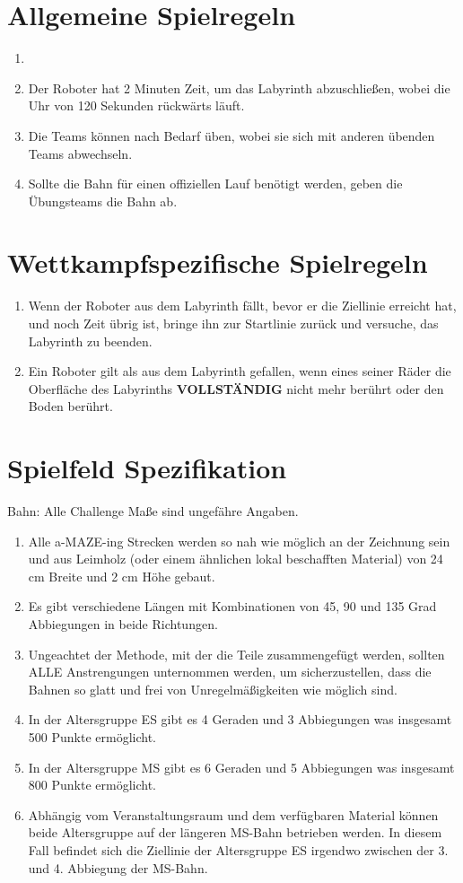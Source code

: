 \documentclass[a4paper,12pt]{article}
\begin{document}
\section{Allgemeine Spielregeln}
\begin{enumerate}
	\item \scoreRuns
	\item Der Roboter hat 2 Minuten Zeit, um das Labyrinth abzuschließen,
		wobei die Uhr von 120 Sekunden rückwärts läuft.
	\item Die Teams können nach Bedarf üben, wobei sie sich mit anderen
		übenden Teams abwechseln.
	\item Sollte die Bahn für einen offiziellen Lauf benötigt werden, geben
		die Übungsteams die Bahn ab.
\end{enumerate}

\section{Wettkampfspezifische Spielregeln}
\begin{enumerate}
	\item Wenn der Roboter aus dem Labyrinth fällt, bevor er die Ziellinie
		erreicht hat, und noch Zeit übrig ist, bringe ihn zur
		Startlinie zurück und versuche, das Labyrinth zu beenden.
	\item Ein Roboter gilt als aus dem Labyrinth gefallen, wenn eines
		seiner Räder die Oberfläche des Labyrinths \textbf{VOLLSTÄNDIG}
		nicht mehr berührt oder den Boden berührt.
\end{enumerate}

\section{Spielfeld Spezifikation}

Bahn: Alle Challenge Maße sind ungefähre Angaben.
\begin{enumerate}
	\item Alle a-MAZE-ing Strecken werden so nah wie möglich an der
		Zeichnung sein und aus Leimholz (oder einem ähnlichen lokal
		beschafften Material) von 24 cm Breite und 2 cm Höhe gebaut.
	\item Es gibt verschiedene Längen mit Kombinationen von 45, 90 und 135
		Grad Abbiegungen in beide Richtungen.
	\item Ungeachtet der Methode, mit der die Teile zusammengefügt werden,
		sollten ALLE Anstrengungen unternommen werden, um
		sicherzustellen, dass die Bahnen so glatt und frei von
		Unregelmäßigkeiten wie möglich sind.
	\item In der Altersgruppe ES gibt es 4 Geraden und 3 Abbiegungen was
		insgesamt 500 Punkte ermöglicht.
	\item In der Altersgruppe MS gibt es 6 Geraden und 5 Abbiegungen was
		insgesamt 800 Punkte ermöglicht.
	\item Abhängig vom Veranstaltungsraum und dem verfügbaren Material
		können beide Altersgruppe auf der längeren MS-Bahn betrieben
		werden. In diesem Fall befindet sich die Ziellinie der
		Altersgruppe ES irgendwo zwischen der 3. und 4. Abbiegung der
		MS-Bahn.
\end{enumerate}
\end{document}
